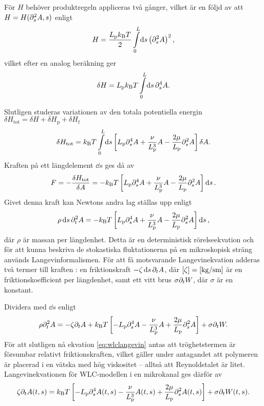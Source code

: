 För $H$ behöver produktregeln appliceras två gånger, vilket är en följd av att $H = H(\partial_s^2A,s)$ enligt 
\begin{equation}
     H = \frac{ L_\text{p}\kbT}{2}\int_0^L\!\dd{s}\left(\pd_s^2A\right)^2,
\end{equation}
vilket efter en analog beräkning ger 
\begin{equation}
     \delta H = L_\text{p}\kbT \int_0^L\!\dd{s} \pd_s^4A.
\end{equation}

Slutligen studeras variationen av den totala potentiella energin $\delta H_\text{tot} = \delta H + \delta H_{\text{p}} + \delta H_{\text{f}}$ 
\begin{equation}
     \delta H_\text{tot} = \kbT\int_0^L\!\dd{s} \left[L_\text{p}\pd_s^4A+\frac{\nu}{L_\text{p}^3}A -\frac{2\mu}{L_\text{p}}\pd_s^2A\right]\delta A. 
\end{equation}
Kraften på ett längdelement $\dd{s}$ ges då av 
\begin{equation}\label{eq:F}
      F = -\frac{\delta H_\text{tot}}{\delta A} = -k_{\text{B}}T\left[L_\text{p}\partial_s^4A+\frac{\nu}{L_\text{p}^3}A-\frac{2\mu}{L_\text{p}}\partial_s^2A \right]\dd{s} .
\end{equation}
Givet denna kraft kan Newtons andra lag ställas upp enligt 
\begin{equation}
      \rho\dd{s}\partial_t^2A = -k_{\text{B}}T\left[L_\text{p}\partial_s^4A+\frac{\nu}{L_\text{p}^3}A-\frac{2\mu}{L_\text{p}}\partial_s^2A \right]\dd{s},
\end{equation}
där $\rho$ är massan per längdenhet. Detta är en deterministisk rörelseekvation och för att kunna beskriva de stokastiska fluktationerna på en mikroskopisk sträng används Langevinformalismen. För att få motsvarande Langevinekvation adderas två termer till kraften \cite{Bullerjahn2011,Dhar,VanKampen2007}: en friktionskraft $-\zeta\dd{s}\partial_tA$, där $[\zeta] = \unit[]{[kg/sm]}$ är en friktionskoefficient per längdenhet, samt ett vitt brus $\sigma\partial_t W$, där $\sigma$ är en konstant.

Dividera med $\dd{s}$ enligt 
\begin{equation}
      \rho\partial_t^2A = -\zeta\partial_tA+ k_{\text{B}}T\left[-L_\text{p}\partial_s^4A-\frac{\nu}{L_\text{p}^3}A+\frac{2\mu}{L_\text{p}}\partial_s^2A \right]+\sigma\partial_tW.
\end{equation}
För att slutligen nå ekvation \eqref{eq:wlclangevin} antas att tröghetstermen är försumbar relativt friktionskraften, vilket gäller under antagandet att polymeren är placerad i en vätska med hög viskositet \cite{Dhar} -- alltså att Reynoldstalet är litet. Langevinekvationen för WLC-modellen i en mikrokanal ges därför av
\begin{equation}
    \zeta\partial_tA(t,s) = k_{\text{B}}T\left[-L_\text{p}\partial_s^4A(t,s)-\frac{\nu}{L_\text{p}^3}A(t,s)+\frac{2\mu}{L_\text{p}}\partial_s^2A(t,s) \right]+\sigma\partial_tW(t,s).
\end{equation}



